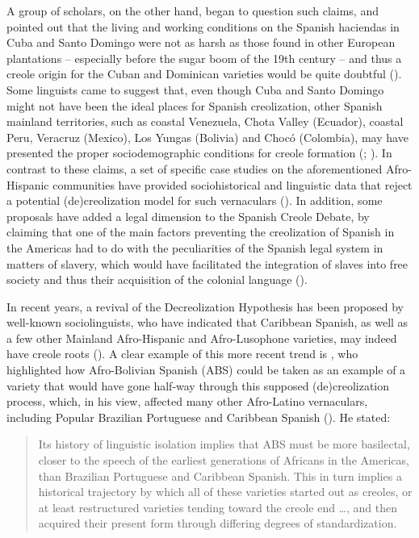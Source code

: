 \documentclass[output=paper,colorlinks,citecolor=brown]{langscibook}
\begin{document}
A group of scholars, on the other hand, began to question such claims, and pointed out that the living and working conditions on the Spanish haciendas in Cuba and Santo Domingo were not as harsh as those found in other European plantations -- especially before the sugar boom of the 19th century -- and thus a creole origin for the Cuban and Dominican varieties would be quite doubtful (\citealt{Mintz1971,laurence1974caribbean,Chaudenson1992,Lipski1993,Ortiz-López1998,Clements2009}). Some linguists came to suggest that, even though Cuba and Santo Domingo might not have been the ideal places for Spanish creolization, other Spanish mainland territories, such as coastal Venezuela, Chota Valley (Ecuador), coastal Peru, Veracruz (Mexico), Los Yungas (Bolivia) and Chocó (Colombia), may have presented the proper sociodemographic conditions for creole formation (\citealt{Schwegler1999,Schwegler2018,Lipski2008,Perez2015}; \citealt{alvarez_obediente1998,McWhorter2000}). In contrast to these claims, a set of specific case studies on the aforementioned Afro-Hispanic communities have provided sociohistorical and linguistic data that reject a potential (de)creolization model for such vernaculars (\citealt{Díaz-Campos_clements2008,Sessarego2013_iberia,Sessarego2013_chotavalley,Sessarego2014,Sessarego2019,Sessarego_inpress}).
In addition, some proposals have added a legal dimension to the Spanish Creole Debate, by claiming that one of the main factors preventing the creolization of Spanish in the Americas had to do with the peculiarities of the Spanish legal system in matters of slavery, which would have facilitated the integration of slaves into free society and thus their acquisition of the colonial language (\citealt{Sessarego2015,Sessarego2017,Sessarego2018_enhancing}).

In recent years, a revival of the Decreolization Hypothesis has been proposed by well-known sociolinguists, who have indicated that Caribbean Spanish, as well as a few other Mainland Afro-Hispanic and Afro-Lusophone varieties, may indeed have creole roots (\citealt{Guy2017,Schwegler2014,Schwegler2018}). A clear example of this more recent trend is \citet[72]{Guy2017}, who highlighted how Afro-Bolivian Spanish (ABS) could be taken as an example of a variety that would have gone half-way through this supposed (de)creolization process, which, in his view, affected many other Afro-Latino vernaculars, including Popular Brazilian Portuguese and Caribbean Spanish (\citealt{guy1981linguistic}). He stated:

\begin{quote}
Its history of linguistic isolation implies that ABS must be more basilectal, closer to the speech of the earliest generations of Africans in the Americas, than Brazilian Portuguese and Caribbean Spanish. This in turn implies a historical trajectory by which all of these varieties started out as creoles, or at least restructured varieties tending toward the creole end …, and then acquired their present form through differing degrees of standardization.
\end{quote}
\end{document}
